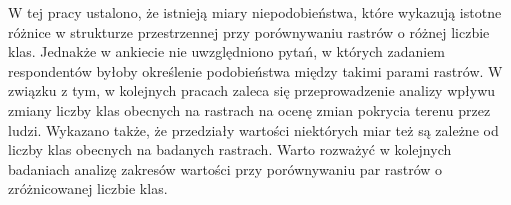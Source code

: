 \documentclass{amuthesis}
\begin{document}
W tej pracy ustalono, że istnieją miary niepodobieństwa, które wykazują
istotne różnice w strukturze przestrzennej przy porównywaniu rastrów o
różnej liczbie klas. Jednakże w ankiecie nie uwzględniono pytań, w
których zadaniem respondentów byłoby określenie podobieństwa między
takimi parami rastrów. W związku z tym, w kolejnych pracach zaleca się
przeprowadzenie analizy wpływu zmiany liczby klas obecnych na rastrach
na ocenę zmian pokrycia terenu przez ludzi. Wykazano także, że
przedziały wartości niektórych miar też są zależne od liczby klas
obecnych na badanych rastrach. Warto rozważyć w kolejnych badaniach
analizę zakresów wartości przy porównywaniu par rastrów o zróżnicowanej
liczbie klas.

\printbibliography[heading=bibintoc, title=Bibliografia]
\end{document}
